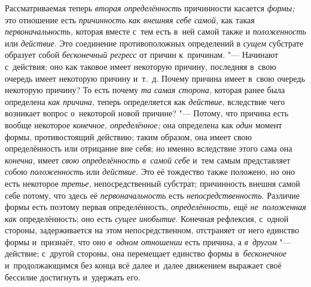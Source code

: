 Рассматриваемая теперь {\em вторая определённость} причинности касается
{\em формы;} это отношение есть {\em причинность как внешняя себе самой,} как
такая {\em первоначальность,} которая вместе с~тем есть в~ней самой также и
{\em положенность} или {\em действие}. Это соединение противоположных
определений в {\em сущем} субстрате образует собой {\em бесконечный регресс} от
причин к~причинам. "--- Начинают с~действия; оно как таковое имеет некоторую
причину, последняя в~свою очередь имеет некоторую причину и~т.~д. Почему
причина имеет в~свою очередь некоторую причину? То есть почему
{\em та самая сторона,} которая ранее была определена {\em как причина,} теперь
определяется как {\em действие,} вследствие чего возникает вопрос о~некоторой
новой причине? "--- Потому, что причина есть вообще некоторое
{\em конечное, определённое;} она определена как {\em один} момент формы,
противостоящий действию; таким образом, она имеет свою определённость или
отрицание вне себя; но именно вследствие этого сама она {\em конечна,} имеет
{\em свою определённость в~самой себе} и~тем самым представляет собою
{\em положенность} или {\em действие}. Это её тождество также положено, но оно
есть некоторое {\em третье,} непосредственный субстрат; причинность внешня
самой себе потому, что здесь её {\em первоначальность} есть
{\em непосредственность}. Различие формы есть поэтому первая определённость,
{\em определённость,} ещё {\em не~положенная как} определённость; оно есть
{\em сущее инобытие}. Конечная рефлексия, с~одной стороны, задерживается на
этом непосредственном, отстраняет от него единство формы и~признаёт, что оно
{\em в~одном отношении} есть причина, а {\em в~другом} "--- действие;
с~другой стороны, она перемещает единство формы в~{\em бесконечное}
и~продолжающимся без конца всё далее и~далее движением
выражает своё бессилие достигнуть и~удержать его.

